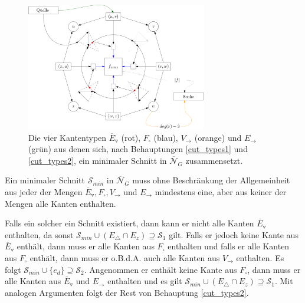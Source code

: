 \begin{figure}[h]
	\centering
  	\includegraphics[width=0.7\textwidth]{face_cut.png}
  	\caption{Die vier Kantentypen $\overline{E}_\triangledown$ (rot), $F_\square$ (blau), $V_\to$ (orange) und $E_\to$ (grün) aus denen sich, nach Behauptungen \ref{cut_types1} und \ref{cut_types2}, ein minimaler Schnitt in $\overline{\mathcal{N}}_G$ zusammensetzt.}
\end{figure}

\begin{claim}\label{cut_types2}

Ein minimaler Schnitt $\mathcal{S}_{min}$ in $\overline{\mathcal{N}}_G$ muss ohne Beschränkung der Allgemeinheit aus jeder der Mengen $\overline{E}_\triangledown, F_\square, V_\to$ und $E_\to$ mindestens eine, aber aus keiner der Mengen alle Kanten enthalten.

\end{claim}

Falls ein solcher ein Schnitt existiert, dann kann er nicht alle Kanten $\overline{E}_\triangledown$ enthalten, da sonst $\mathcal{S}_{min} \cup (E_\triangle \cap E_z) \supseteq \mathcal{S}_1$ gilt. Falls er jedoch keine Kante aus $\overline{E}_\triangledown$ enthält, dann muss er alle Kanten aus $F_\square$ enthalten und falls er alle Kanten aus $F_\square$ enthält, dann muss er o.B.d.A. auch alle Kanten aus $V_\to$ enthalten. Es folgt $\mathcal{S}_{min} \cup \{e_d\} \supseteq \mathcal{S}_2$. Angenommen er enthält keine Kante aus $F_\square$, dann muss er alle Kanten aus $\overline{E}_\triangledown$ und $E_\to$ enthalten und es gilt $\mathcal{S}_{min} \cup (E_\triangle \cap E_z) \supseteq \mathcal{S}_1$. Mit analogen Argumenten folgt der Rest von Behauptung \ref{cut_types2}. \\

